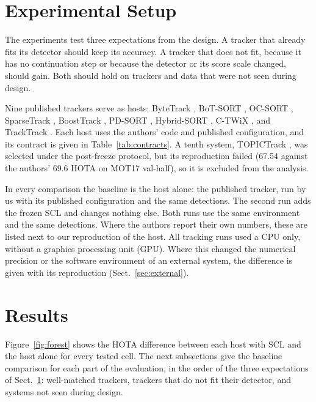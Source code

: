 \documentclass[pdflatex,sn-mathphys-num]{sn-jnl}
\newcommand{\scl}{SCL}
\begin{document}
\section{Experimental Setup}\label{sec:setup}

The experiments test three expectations from the design. A tracker that
already fits its detector should keep its accuracy. A tracker that does not
fit, because it has no continuation step or because the detector or its
score scale changed, should gain. Both should hold on trackers and data that
were not seen during design.

\label{sec:hosts}Nine published trackers serve as hosts: ByteTrack
\cite{zhang2022bytetrack}, BoT-SORT \cite{aharon2022botsort}, OC-SORT
\cite{cao2023ocsort}, SparseTrack \cite{liu2025sparsetrack}, BoostTrack
\cite{stanojevic2024boosttrack}, PD-SORT \cite{wang2025pdsort},
Hybrid-SORT \cite{yang2024hybridsort}, C-TWiX \cite{miah2025twix}, and
TrackTrack \cite{shim2025tracktrack}. Each host uses the authors' code and
published configuration, and its contract is given in
Table~\ref{tab:contracts}. A tenth system, TOPICTrack
\cite{cao2025topictrack}, was selected under the post-freeze protocol, but
its reproduction failed (67.54 against the authors' 69.6 HOTA on MOT17
val-half), so it is excluded from the analysis.

In every comparison the baseline is the host alone: the published tracker,
run by us with its published configuration and the same detections. The
second run adds the frozen \scl{} and changes nothing else. Both runs use the
same environment and the same detections. Where the authors report their own
numbers, these are listed next to our reproduction of the host. All tracking
runs used a CPU only, without a graphics processing unit (GPU).
Where this changed the numerical precision or the software environment of an
external system, the difference is given with its reproduction
(Sect.~\ref{sec:external}).
\section{Results}\label{sec:results}

Figure~\ref{fig:forest} shows the HOTA difference between each host with
\scl{} and the host alone for every tested cell. The next subsections give
the baseline comparison for each part of the evaluation, in the order of the
three expectations of Sect.~\ref{sec:setup}: well-matched trackers, trackers
that do not fit their detector, and systems not seen during design.
\end{document}
